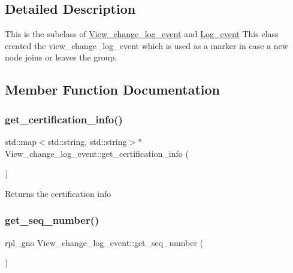 \subsection{Detailed Description}
This is the subclass of \mbox{\hyperlink{classView__change__log__event}{View\+\_\+change\+\_\+log\+\_\+event}} and \mbox{\hyperlink{classLog__event}{Log\+\_\+event}} This class created the view\+\_\+change\+\_\+log\+\_\+event which is used as a marker in case a new node joins or leaves the group. 

\subsection{Member Function Documentation}
\mbox{\label{classView__change__log__event_a2f98b589495213f0d7bbcf21938a1f7a}} 
\subsubsection{\texorpdfstring{get\+\_\+certification\+\_\+info()}{get\_certification\_info()}}
{\footnotesize\ttfamily std\+::map$<$std\+::string, std\+::string$>$$\ast$ View\+\_\+change\+\_\+log\+\_\+event\+::get\+\_\+certification\+\_\+info (\begin{DoxyParamCaption}{ }\end{DoxyParamCaption})\hspace{0.3cm}{\ttfamily [inline]}}

Returns the certification info \mbox{\label{classView__change__log__event_ac20c18e4ed6439f1cc2c28631112de2f}} 
\subsubsection{\texorpdfstring{get\+\_\+seq\+\_\+number()}{get\_seq\_number()}}
{\footnotesize\ttfamily rpl\+\_\+gno View\+\_\+change\+\_\+log\+\_\+event\+::get\+\_\+seq\+\_\+number (\begin{DoxyParamCaption}{ }\end{DoxyParamCaption})\hspace{0.3cm}{\ttfamily [inline]}}

